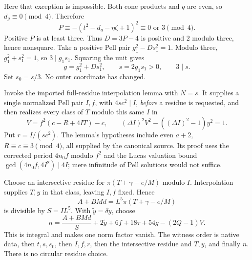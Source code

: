 Here that exception is impossible. Both cone products and $q$ are even,
so $d_g\equiv0\pmod4$. Therefore
\[
 P\equiv-(t^2-d_g-\eta\zeta+1)^2\equiv0\text{ or }3\pmod4.
\]
Positive $P$ is at least three. Thus $D=3P-4$ is positive and
$2$ modulo three, hence nonsquare. Take a positive Pell pair
$g_1^2-Ds_1^2=1$. Modulo three, $g_1^2+s_1^2=1$, so
$3\mid g_1s_1$. Squaring the unit gives
\[
 g=g_1^2+Ds_1^2,\qquad s=2g_1s_1>0,
 \qquad 3\mid s.
\]
Set $s_0=s/3$. No outer coordinate has changed.

Invoke the imported full-residue interpolation lemma with $N=s$.
It supplies a single normalized Pell pair $I,f$, with $4sc^2\mid I$,
\emph{before} a residue is requested, and then realizes every class
of $T$ modulo this same $I$ in
\[
 V=f^2(c-R+4IT)-c,\qquad
 (\Delta I)^2V^2-((\Delta I)^2-1)y^2=1.
\]
Put $r=I/(sc^2)$. The lemma's hypotheses include even $a+2$,
$R\equiv c\equiv3\pmod4$, all supplied by the canonical source.
Its proof uses the corrected period $4n_0f$ modulo $f^2$ and the
Lucas valuation bound $\gcd(4n_0f,4I^2)\mid4I$; mere infinitude of
Pell solutions would not suffice.

Choose an intersective residue for
$\pi(T+\gamma-e/M)$ modulo $I$. Interpolation supplies $T,y$ in that
class, leaving $I,f$ fixed. Hence
\[
 A+BMd=L^5\pi(T+\gamma-e/M)
\]
is divisible by $S=IL^5$. With $\widetilde y=\delta y$, choose
\[
 n=\frac{A+BMd}{S}+2\widetilde y+6f+18\tau+54g-(2Q-1)V.
\]
This is integral and makes one norm factor vanish. The witness order is
native data, then $t,s,s_0$, then $I,f,r$, then the intersective residue
and $T,y$, and finally $n$. There is no circular residue choice.


